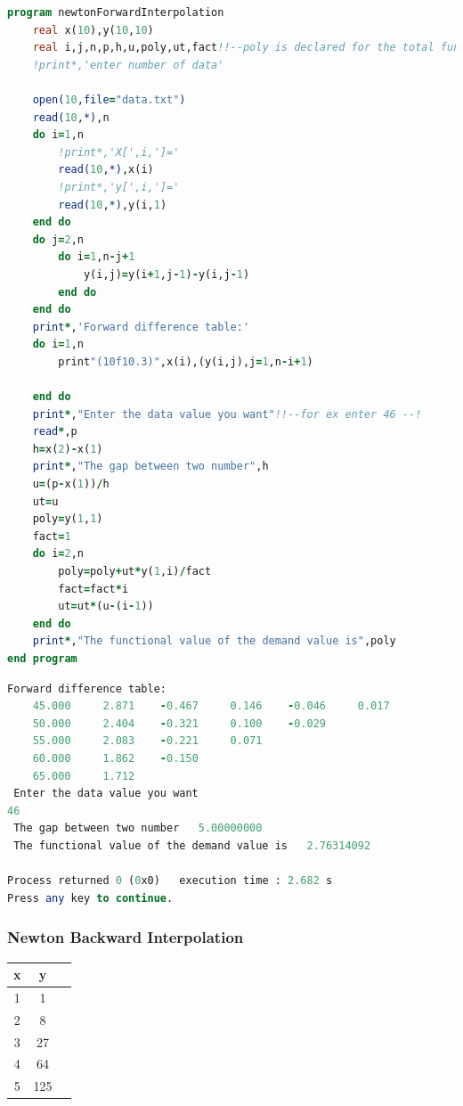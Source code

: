 \documentclass{article}
\begin{document}
\begin{lstlisting}[language=Fortran,caption=Newton Forward Interpolation]
program newtonForwardInterpolation
    real x(10),y(10,10)
    real i,j,n,p,h,u,poly,ut,fact!!--poly is declared for the total functioanl value --!!
    !print*,'enter number of data'

    open(10,file="data.txt")
    read(10,*),n
    do i=1,n
        !print*,'X[',i,']='
        read(10,*),x(i)
        !print*,'y[',i,']='
        read(10,*),y(i,1)
    end do
    do j=2,n
        do i=1,n-j+1
            y(i,j)=y(i+1,j-1)-y(i,j-1)
        end do
    end do
    print*,'Forward difference table:'
    do i=1,n
        print"(10f10.3)",x(i),(y(i,j),j=1,n-i+1)

    end do
    print*,"Enter the data value you want"!!--for ex enter 46 --!
    read*,p
    h=x(2)-x(1)
    print*,"The gap between two number",h
    u=(p-x(1))/h
    ut=u
    poly=y(1,1)
    fact=1
    do i=2,n
        poly=poly+ut*y(1,i)/fact
        fact=fact*i
        ut=ut*(u-(i-1))
    end do
    print*,"The functional value of the demand value is",poly
end program


\end{lstlisting}
\begin{lstlisting}[language=Fortran,caption=Newton Forward Interpolation Output]
 Forward difference table:
    45.000     2.871    -0.467     0.146    -0.046     0.017
    50.000     2.404    -0.321     0.100    -0.029
    55.000     2.083    -0.221     0.071
    60.000     1.862    -0.150
    65.000     1.712
 Enter the data value you want
46
 The gap between two number   5.00000000
 The functional value of the demand value is   2.76314092

Process returned 0 (0x0)   execution time : 2.682 s
Press any key to continue.

\end{lstlisting}
\subsubsection{Newton Backward Interpolation}
\begin{center}
\begin{tabular}{ |c|c|c| } 
\hline
 x & y\\
\hline
 1 & 1  \\  \hline
 2 & 8  \\  \hline
 3 & 27 \\  \hline
 4 & 64  \\  \hline
 5 & 125  \\  \hline

 
 \hline
\end{tabular}
\end{center}
\end{document}
